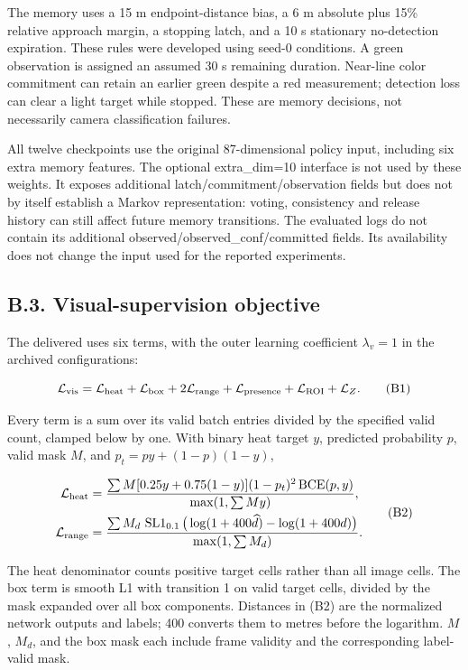 \documentclass[letterpaper,journal,onecolumn]{IEEEtran}
\begin{document}
The memory uses a 15 m endpoint-distance bias, a 6 m absolute plus 15\% relative approach margin, a stopping latch, and a 10 s stationary no-detection expiration. These rules were developed using seed-0 conditions. A green observation is assigned an assumed 30 s remaining duration. Near-line color commitment can retain an earlier green despite a red measurement; detection loss can clear a light target while stopped. These are memory decisions, not necessarily camera classification failures.

All twelve checkpoints use the original 87-dimensional policy input, including six extra memory features. The optional extra\_dim=10 interface is not used by these weights. It exposes additional latch/commitment/observation fields but does not by itself establish a Markov representation: voting, consistency and release history can still affect future memory transitions. The evaluated logs do not contain its additional observed/observed\_conf/committed fields. Its availability does not change the input used for the reported experiments.

\subsection*{B.3. Visual-supervision objective}

The delivered  uses six terms, with the outer learning coefficient \(\lambda_v=1\) in the archived configurations:

\[\mathcal L_{\rm vis}=\mathcal L_{\rm heat}+\mathcal L_{\rm box}
+2\mathcal L_{\rm range}+\mathcal L_{\rm presence}
+\mathcal L_{\rm ROI}+\mathcal L_Z.\tag{B1}\]

Every term is a sum over its valid batch entries divided by the specified valid count, clamped below by one. With binary heat target \(y\), predicted probability \(p\), valid mask \(M\), and \(p_t=py+(1-p)(1-y)\),

\[\begin{aligned}
\mathcal L_{\rm heat}&=\frac{\sum M[0.25y+0.75(1-y)](1-p_t)^2\operatorname{BCE}(p,y)}{\max(1,\sum My)},\\
\mathcal L_{\rm range}&=\frac{\sum M_d\,\operatorname{SL1}_{0.1}\big(\log(1+400\widehat d)-\log(1+400d)\big)}{\max(1,\sum M_d)}.
\end{aligned}\tag{B2}\]

The heat denominator counts positive target cells rather than all image cells. The box term is smooth L1 with transition 1 on valid target cells, divided by the mask expanded over all box components. Distances in (B2) are the normalized network outputs and labels; 400 converts them to metres before the logarithm. \(M\), \(M_d\), and the box mask each include frame validity and the corresponding label-valid mask.
\end{document}

